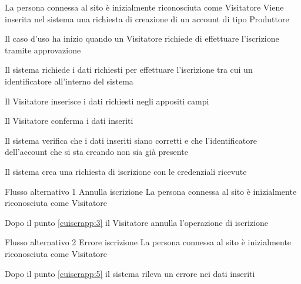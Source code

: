
{}
{La persona connessa al sito è inizialmente riconosciuta come Visitatore}
{Viene inserita nel sistema una richiesta di creazione di un account di tipo Produttore}
{\begin{enumCU}
	\item Il caso d'uso ha inizio quando un Visitatore richiede di effettuare l'iscrizione tramite approvazione
	\item Il sistema richiede i dati richiesti per effettuare l'iscrizione  tra cui un identificatore all'interno del sistema
	\item Il Visitatore inserisce i dati richiesti negli appositi campi \label{cuiscrapp:3}
	\item Il Visitatore conferma i dati inseriti
	\item Il sistema verifica che i dati inseriti siano corretti e che l'identificatore dell'account che si sta creando non sia già presente \label{cuiscrapp:5}
	\item Il sistema crea una richiesta di iscrizione con le credenziali ricevute
\end{enumCU}}
%
{Flusso alternativo 1}%
{Annulla iscrizione}%
{La persona connessa al sito è inizialmente riconosciuta come Visitatore}%
{\postNulle}%
{\begin{enumCU}
		\item Dopo il punto \ref{cuiscrapp:3} il Visitatore annulla l'operazione di iscrizione
	\end{enumCU}}%
%
{Flusso alternativo 2}%
{Errore iscrizione}%
{La persona connessa al sito è inizialmente riconosciuta come Visitatore}%
{\postNulle}%
{\begin{enumCU}
		\item Dopo il punto \ref{cuiscrapp:5} il sistema rileva un errore nei dati inseriti
	\end{enumCU}}%



